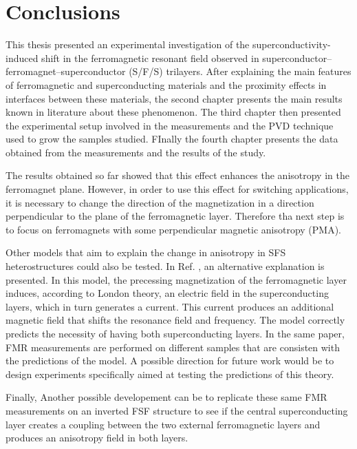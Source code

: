 \documentclass[12pt,a4paper,oneside,openany]{book}
\begin{document}
\chapter*{Conclusions}\label{Conclusions}
This thesis presented an experimental investigation of the superconductivity-induced shift in the ferromagnetic resonant field observed in superconductor–ferromagnet–superconductor (S/F/S) trilayers. After explaining the main features of ferromagnetic and superconducting materials and the proximity effects in interfaces between these materials, the second chapter presents the main results known in literature about these phenomenon. The third chapter then presented the experimental setup involved in the measurements and the PVD technique used to grow the samples studied. FInally the fourth chapter presents the data obtained from the measurements and the results of the study.

The results obtained so far showed that this effect enhances the anisotropy in the ferromagnet plane. However, in order to use this effect for switching applications, it is necessary to change the direction of the magnetization in a direction perpendicular to the plane of the ferromagnetic layer. Therefore tha next step is to focus on ferromagnets with some perpendicular magnetic anisotropy (PMA). 

Other models that aim to explain the change in anisotropy in SFS heterostructures could also be tested. In Ref. \cite{Recent}, an alternative explanation is presented. In this model, the precessing magnetization of the ferromagnetic layer induces, according to London theory, an electric field in the superconducting layers, which in turn generates a current. This current produces an additional magnetic field that shifts the resonance field and frequency. The model correctly predicts the necessity of having both superconducting layers. In the same paper, FMR measurements are performed on different samples that are consisten with the predictions of the model. A possible direction for future work would be to design experiments specifically aimed at testing the predictions of this theory. 

Finally, Another possible developement can be to replicate these same FMR measurements on an inverted FSF structure to see if the central superconducting layer creates a coupling between the two external ferromagnetic layers and produces an anisotropy field in both layers.  

\printbibliography[heading=bibintoc,title={Bibliography}]
\end{document}
